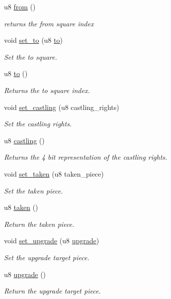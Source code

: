 \begin{DoxyCompactItemize}
u8 \hyperlink{structMove_a3e6186e7f7e7ce520545c43f9f00679e}{from} ()
\begin{DoxyCompactList}\small\item\em returns the from square index \end{DoxyCompactList}\item 
void \hyperlink{structMove_a7736e5d558bee44851f619ab6b866f2f}{set\+\_\+to} (u8 \hyperlink{structMove_a1f98980b97696e23b58b8aaa0c3ee51e}{to})
\begin{DoxyCompactList}\small\item\em Set the to square. \end{DoxyCompactList}\item 
u8 \hyperlink{structMove_a1f98980b97696e23b58b8aaa0c3ee51e}{to} ()
\begin{DoxyCompactList}\small\item\em Returns the to square index. \end{DoxyCompactList}\item 
void \hyperlink{structMove_ac219fedb401bec50df805eeb8c4bfbfd}{set\+\_\+castling} (u8 castling\+\_\+rights)
\begin{DoxyCompactList}\small\item\em Set the castling rights. \end{DoxyCompactList}\item 
u8 \hyperlink{structMove_a63e8e915392c159e8e2260f66ee476ef}{castling} ()
\begin{DoxyCompactList}\small\item\em Returns the 4 bit representation of the castling rights. \end{DoxyCompactList}\item 
void \hyperlink{structMove_ab34f3b5e429c67794171191efc21e3a2}{set\+\_\+taken} (u8 taken\+\_\+piece)
\begin{DoxyCompactList}\small\item\em Set the taken piece. \end{DoxyCompactList}\item 
u8 \hyperlink{structMove_a550cdb71500d27afbd3d480b6c7f0b41}{taken} ()
\begin{DoxyCompactList}\small\item\em Return the taken piece. \end{DoxyCompactList}\item 
void \hyperlink{structMove_a9c40bb72c8a2e4d979880e8476dae31d}{set\+\_\+upgrade} (u8 \hyperlink{structMove_afd8094aef3ce72c43e6635063c3f9bfd}{upgrade})
\begin{DoxyCompactList}\small\item\em Set the upgrade target piece. \end{DoxyCompactList}\item 
u8 \hyperlink{structMove_afd8094aef3ce72c43e6635063c3f9bfd}{upgrade} ()
\begin{DoxyCompactList}\small\item\em Return the upgrade target piece. \end{DoxyCompactList}\end{DoxyCompactItemize}



